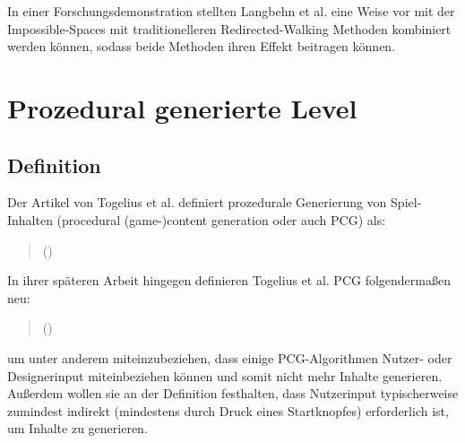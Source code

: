 In einer Forschungsdemonstration \cite{redirected-spaces} stellten Langbehn et al. eine Weise vor mit der Impossible-Spaces mit traditionelleren Redirected-Walking Methoden %
kombiniert werden können, sodass beide Methoden ihren Effekt beitragen können.

\section{Prozedural generierte Level}

\subsection{Definition}

Der Artikel \cite{sbpcg} von Togelius et al. definiert prozedurale Generierung von Spiel-Inhalten (procedural (game-)content generation oder auch PCG) als:

\begin{quotation}
\end{quotation}

\begin{quotation}
    ()
\end{quotation}

In ihrer späteren Arbeit hingegen \cite{what-is-pcg} definieren Togelius et al. PCG folgendermaßen neu:
\begin{quotation}
\end{quotation}

\begin{quotation}
    ()
\end{quotation}
um unter anderem miteinzubeziehen, dass einige PCG-Algorithmen Nutzer- oder Designerinput miteinbeziehen können und somit nicht mehr  Inhalte generieren. Außerdem wollen sie an der Definition festhalten, dass Nutzerinput typischerweise zumindest indirekt (mindestens durch Druck eines Startknopfes) erforderlich ist, um Inhalte zu generieren.

